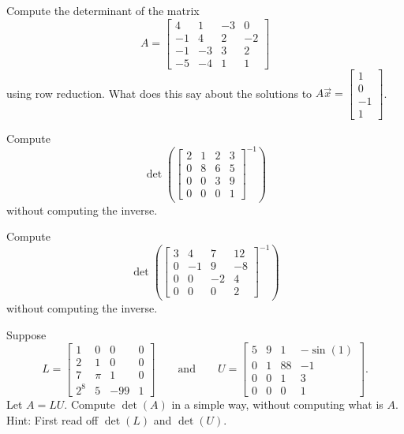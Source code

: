 \begin{exercise}\ansMark%
Compute the determinant of the matrix
\[ A = \begin{bmatrix}
4  & 1 & -3 &  0\\
-1 &  4 &  2 & -2\\
-1 & -3 & 3 & 2\\
-5 & -4 & 1 & 1
\end{bmatrix}
\]
using row reduction. What does this say about the solutions to $A\vec{x} = \left[ \begin{smallmatrix} 1 \\ 0 \\ -1 \\ 1 \end{smallmatrix} \right]$.
\end{exercise}

\begin{exercise}
Compute
\begin{equation*}
\det \left( \begin{bmatrix}
2 & 1 & 2 & 3 \\
0 & 8 & 6 & 5 \\
0 & 0 & 3 & 9 \\
0 & 0 & 0 & 1
\end{bmatrix}^{-1}
\right)
\end{equation*}
without computing the inverse.
\end{exercise}

\begin{exercise}\ansMark%
Compute
\begin{equation*}
\det \left( \begin{bmatrix}
3 & 4 & 7 & 12 \\
0 & -1 & 9 & -8 \\
0 & 0 & -2 & 4 \\
0 & 0 & 0 & 2
\end{bmatrix}^{-1}
\right)
\end{equation*}
without computing the inverse.
\end{exercise}

\begin{exercise}
Suppose
\begin{equation*}
L = \begin{bmatrix}
1 & 0 & 0 & 0 \\
2 & 1 & 0 & 0 \\
7 & \pi & 1 & 0 \\
2^8 & 5 & -99 & 1
\end{bmatrix}
\qquad \text{and} \qquad
U = \begin{bmatrix}
5 & 9 & 1 & -\sin(1) \\
0 & 1 & 88 & -1 \\
0 & 0 & 1 & 3 \\
0 & 0 & 0 & 1
\end{bmatrix} .
\end{equation*}
Let $A = LU$.  Compute $\det(A)$ in a simple way, without computing what is $A$.
Hint: First read off $\det(L)$ and $\det(U)$.
\end{exercise}

